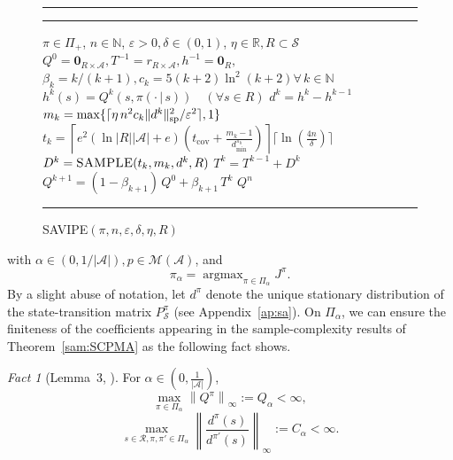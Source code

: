 \documentclass{article}
\theoremstyle{definition}
\theoremstyle{remark}
\newtheorem{fact}{Fact}
\DeclareMathOperator*{\argmax}{argmax}
\newcommand{\real}{\mathbb{R}}
\newcommand{\cA}{\mathcal{A}}
\newcommand{\cS}{\mathcal{S}}
\newcommand{\cM}{\mathcal{M}}
\newcommand{\cR}{\mathcal{R}}
\newcommand{\NN}{\mathbb{N}}
\newcommand*{\infn}[1]{\left\|{#1}\right\|_{\infty}}
\renewcommand{\sp}[1]{\|{#1}\|_\text{\rm sp}}
\begin{document}
\begin{figure}
\vspace{-.1in}
\captionsetup{type=algorithm}
\hrule
\vspace{2pt}
\begin{minipage}{0.57\textwidth}
 \caption{\sc \mbox{SAVIPE}$( \pi, n,  \varepsilon,\delta, \eta, R)$}
   \label{alg:SAVIPE}
\vspace{-.1in}
\hrule
\begin{algorithmic}
      $\pi \in \Pi_+$, $n\in\NN$, $\varepsilon\!>\!0,\delta\!\in\!(0,1)$, $\eta \in \real, R\!\subset\!\cS$  
   $Q^0\!=\!\mathbf{0}_{R\times \cA}, T^{-1}\!=\!r_{R\times \cA}, h^{-1}\!=\!\mathbf{0}_R,$    $\beta_k=k/(k\!+\!1),  c_k=5(k\!+\!2)\ln^2(k\!+\!2)  \forall \, k \in \NN $
     \State $h^k(s)= Q^{k}(s,\pi(\cdot \,|\, s))\quad(\forall s\in R)$
     \State $d^k=h^k-h^{k-1}$
    \State $m_k= \max\{\lceil \eta\,n^2c_k\sp{d^k}^2/\varepsilon^{2}\rceil,1\}$
    \State $t_k\!=\!\left\lceil e^2( \ln\!|R||\cA|\!+\!e)\!\left( t_{\mathrm{cov}}\!+\!\frac{m_k-1}{d^{\pi_b}_{\mathrm{min}}}\right)
\right\rceil \!\lceil \ln(\frac{4n}{\delta})\rceil$
     \State $D^k=\mbox{\sc SAMPLE}( t_k, m_k, d^k, R)$ 
     \State $T^k=T^{k-1}+D^k$ 
            \State $Q^{k+1} =(1\!-\!\beta_{k+1})\,Q^0+\beta_{k+1}\, T^{k}$
   \EndFor
    $Q^{n}$ 
\end{algorithmic}
\hrule
\end{minipage}
\vspace{-.1in}
\end{figure}
with $\alpha \in (0,1/|\cA|), p \in \cM(\cA)$, and  
\[\pi_\alpha =\argmax_{\pi \in \Pi_\alpha} J^\pi.\] By a slight abuse of notation, let $d^\pi$ denote the unique stationary distribution of the state-transition matrix $P^{\pi}_{\scriptscriptstyle \cS}$ (see Appendix~\ref{ap:sa}). On $\Pi_\alpha$, we can ensure the finiteness of the coefficients appearing in the sample-complexity results of Theorem~\ref{sam:SCPMA} as the following fact shows.
\begin{fact}[Lemma~3, \cite{lee2025multi}]\label{fact:bound}
\!For $\alpha\!\in\!(0,\frac{1}{|\cA|})$, 
    \[ \max_{\pi \in \Pi_\alpha}\infn{Q^{\pi}} :=Q_{\alpha} < \infty, \]
    \[\max_{
s \in \cR,
\pi,\pi' \in \Pi_\alpha
} \infn{\frac{d^{\pi}(s)}{d^{\pi'}(s)}}\!\!:=\!C_{\alpha}<\infty.\]  \end{fact}  
\end{document}
